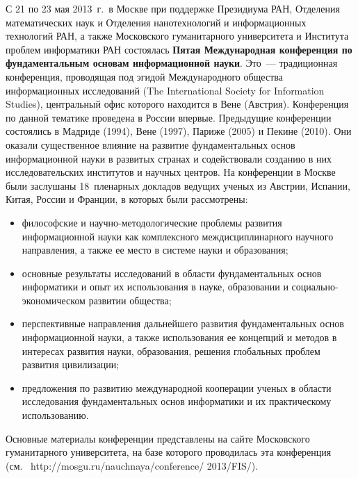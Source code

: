 \begin{multicols}{2}



   С 21 по 23 мая 2013~г.\ в Москве при поддержке Президиума РАН, Отделения 
математических наук и Отделения нанотехнологий и информа\-ци\-онных технологий РАН, а 
также Московского гу\-манитарного университета и Института проблем информатики РАН 
состоялась \textbf{Пятая Международная конференция по фундаментальным основам 
информационной науки}. Это~--- традиционная конференция, проводящая под эгидой 
Международного общества информационных исследований (The International Society for 
Information Studies), центральный офис которого находится в Вене (Австрия). 
Конференция по данной тематике проведена в России впервые. Предыдущие конференции 
состоялись в Мадриде (1994), Вене (1997), Париже (2005) и Пекине (2010). Они оказали 
существенное влияние на развитие фундаментальных основ информационной науки в 
развитых странах и содействовали созданию в них исследовательских институтов и 
научных центров. На конференции в Москве были заслушаны 18~пленарных докладов 
ведущих ученых из Австрии, Испании, Китая, России и Франции, в которых были 
рассмотрены: 
   \begin{itemize}
\item философские и научно-ме\-то\-до\-ло\-ги\-че\-ские проблемы развития информационной 
науки как комплексного междисциплинарного научного направления, а также ее место 
в системе науки и образования;
\item основные результаты исследований в области фундаментальных основ 
информатики и опыт их использования в науке, образовании и 
со\-ци\-аль\-но-эко\-но\-ми\-че\-ском развитии общества;
\item перспективные направления дальнейшего развития фундаментальных основ 
информационной науки, а также использования ее концепций и методов в интересах 
развития науки, образования, решения глобальных проблем развития цивилизации;
\item предложения по развитию международной кооперации ученых в области 
исследования фундаментальных основ информатики и их практическому 
использованию.
\end{itemize}

   Основные материалы конференции представлены на сайте Московского 
гуманитарного уни\-вер\-ситета, на базе которого проводилась эта конференция  (см.\ {\sf 
http://mosgu.ru/nauchnaya/conference/ 2013/FIS/}). 
   

\end{multicols}
